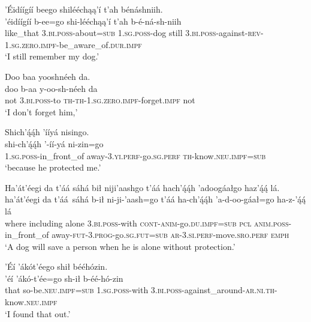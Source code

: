 \ea\label{ex:text6-15-17}
’Éidíígíí beego shilééchąą’í t’ah bénáshniih.\\
\gll ’éidíígíí	b-ee=go	shi-lééchąą’í	t’ah	b-é-ná-sh-niih\\
     like\_that	3.\textsc{bi}.\textsc{poss}-about=\textsc{sub}	1.\textsc{sg}.\textsc{poss}-dog	still	3.\textsc{bi}.\textsc{poss}-against-\textsc{rev}-1.\textsc{sg}.\textsc{zero}.\textsc{impf}-be\_aware\_of.\textsc{dur}.\textsc{impf}\\
\glt `I still remember my dog.'
\z

\ea\label{ex:text6-15-18}
Doo baa yooshnéeh da.\\
\gll doo	b-aa	y-oo-sh-néeh	da\\
     not	3.\textsc{bi}.\textsc{poss}-to	\textsc{th}-\textsc{th}-1.\textsc{sg}.\textsc{zero}.\textsc{impf}-forget.\textsc{impf}	not\\
\glt `I don't forget him,'
\z

\ea\label{ex:text6-15-19}
Shich’ą́ą́h ’ííyá nisingo.\\
\gll shi-ch’ą́ą́h	’-íí-yá	ni-zin=go\\
     1.\textsc{sg}.\textsc{poss}-in\_front\_of	away-3.\textsc{yi}.\textsc{perf}-go.\textsc{sg}.\textsc{perf}	\textsc{th}-know.\textsc{neu}.\textsc{impf}=\textsc{sub}\\
\glt `because he protected me.'
\z

\ea\label{ex:text6-15-20}
Ha’át’éegi da t’áá sáhá bił niji’aashgo t’áá hach’ą́ą́h ’adoogáałgo haz’ą́ą́ lá.\\
\gll ha’át’éegi	da	t’áá~{sáhá}	b-ił	ni-ji-’aash=go	t’áá	ha-ch’ą́ą́h	’a-d-oo-gáał=go	ha-z-’ą́ą́	lá\\
     where	including	alone	3.\textsc{bi}.\textsc{poss}-with	\textsc{cont}-\textsc{anim}-go.\textsc{du}.\textsc{impf}=\textsc{sub}	\textsc{pcl}	\textsc{anim}.\textsc{poss}-in\_front\_of	away-\textsc{fut}-3.\textsc{prog}-go.\textsc{sg}.\textsc{fut}=\textsc{sub}	\textsc{ar}-3.\textsc{si}.\textsc{perf}-move.\textsc{sro}.\textsc{perf}	\textsc{emph}\\
\glt `A dog will save a person when he is alone without protection.'
\z

\ea\label{ex:text6-15-21}
’Éí ’ákót’éego shił bééhózin.\\
\gll ’éí	’ákó-t’ée=go	sh-ił	b-éé-hó-zin\\
     that	so-be.\textsc{neu}.\textsc{impf}=\textsc{sub}	1.\textsc{sg}.\textsc{poss}-with	3.\textsc{bi}.\textsc{poss}-against\_around-\textsc{ar}.\textsc{ni}.\textsc{th}-know.\textsc{neu}.\textsc{impf}\\
\glt `I found that out.'
\z

